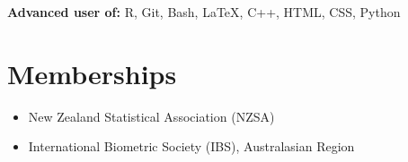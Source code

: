 \documentclass[10pt,a4paper]{moderncv}
\begin{document}
\vspace{6pt}
\textbf{Advanced user of:} R, Git, Bash, \LaTeX, C++, HTML, CSS, Python

\section{Memberships}

\vspace{6pt}
\begin{itemize}
\item New Zealand Statistical Association (NZSA)
\item International Biometric Society (IBS), Australasian Region
\end{itemize}

\end{document}
